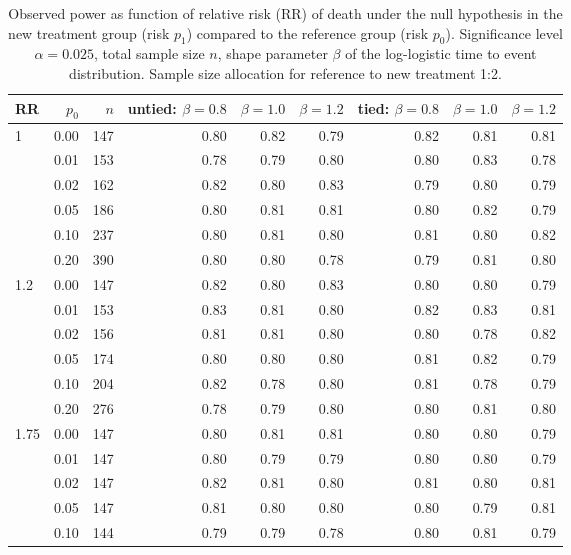 \documentclass[bimj,fleqn]{w-art}\usepackage[]{graphicx}\usepackage[]{color}
\theoremstyle{plain}
\theoremstyle{definition}
\begin{document}
\begin{table}[ht]
\centering
\caption{Observed power as function of relative risk
             (RR) of death under the null hypothesis in the new treatment group
             (risk $p_1$) compared to the reference group (risk $p_0$).
             Significance level $\alpha =0.025$, total sample size $n$,
             shape parameter $\beta$ of the log-logistic time to event
             distribution. Sample size allocation for reference to new
             treatment 1:2. } 
\label{tab:simresult}
\begin{tabular}{lrrrrrrrr}
  \hline
RR & $p_0$ & $n$ & untied: $\beta = 0.8$ & $\beta = 1.0$ & $\beta = 1.2$ & tied: $\beta = 0.8$ & $\beta = 1.0$ & $\beta = 1.2$ \\ 
  \hline
1 & 0.00 & 147 & 0.80 & 0.82 & 0.79 & 0.82 & 0.81 & 0.81 \\ 
    & 0.01 & 153 & 0.78 & 0.79 & 0.80 & 0.80 & 0.83 & 0.78 \\ 
    & 0.02 & 162 & 0.82 & 0.80 & 0.83 & 0.79 & 0.80 & 0.79 \\ 
    & 0.05 & 186 & 0.80 & 0.81 & 0.81 & 0.80 & 0.82 & 0.79 \\ 
    & 0.10 & 237 & 0.80 & 0.81 & 0.80 & 0.81 & 0.80 & 0.82 \\ 
    & 0.20 & 390 & 0.80 & 0.80 & 0.78 & 0.79 & 0.81 & 0.80 \\ 
  1.2 & 0.00 & 147 & 0.82 & 0.80 & 0.83 & 0.80 & 0.80 & 0.79 \\ 
    & 0.01 & 153 & 0.83 & 0.81 & 0.80 & 0.82 & 0.83 & 0.81 \\ 
    & 0.02 & 156 & 0.81 & 0.81 & 0.80 & 0.80 & 0.78 & 0.82 \\ 
    & 0.05 & 174 & 0.80 & 0.80 & 0.80 & 0.81 & 0.82 & 0.79 \\ 
    & 0.10 & 204 & 0.82 & 0.78 & 0.80 & 0.81 & 0.78 & 0.79 \\ 
    & 0.20 & 276 & 0.78 & 0.79 & 0.80 & 0.80 & 0.81 & 0.80 \\ 
  1.75 & 0.00 & 147 & 0.80 & 0.81 & 0.81 & 0.80 & 0.80 & 0.79 \\ 
    & 0.01 & 147 & 0.80 & 0.79 & 0.79 & 0.80 & 0.80 & 0.79 \\ 
    & 0.02 & 147 & 0.82 & 0.81 & 0.80 & 0.81 & 0.80 & 0.81 \\ 
    & 0.05 & 147 & 0.81 & 0.80 & 0.80 & 0.80 & 0.79 & 0.81 \\ 
    & 0.10 & 144 & 0.79 & 0.79 & 0.78 & 0.80 & 0.81 & 0.79 \\ 

\end{tabular}
\end{table}
\end{document}
